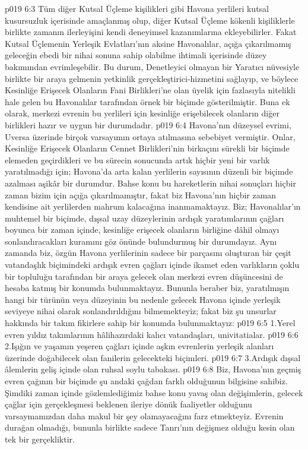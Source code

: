\vs p019 6:3 Tüm diğer Kutsal Üçleme kişilikleri gibi Havona yerlileri kutsal kusursuzluk içerisinde amaçlanmış olup, diğer Kutsal Üçleme kökenli kişiliklerle birlikte zamanın ilerleyişini kendi deneyimsel kazanımlarına ekleyebilirler. Fakat Kutsal Üçlemenin Yerleşik Evlatları’nın aksine Havonalılar, açığa çıkarılmamış geleceğin ebedi bir nihai sonuna sahip olabilme ihtimali içerisinde düzey bakımından evrimleşebilir. Bu durum, Denetleyici olmayan bir Yaratıcı nüvesiyle birlikte bir araya gelmenin yetkinlik gerçekleştirici\hyp{}hizmetini sağlayıp, ve böylece Kesinliğe Erişecek Olanların Fani Birlikleri’ne olan üyelik için fazlasıyla nitelikli hale gelen bu Havonalılar tarafından örnek bir biçimde gösterilmiştir. Buna ek olarak, merkezi evrenin bu yerlileri için kesinliğe erişebilecek olanların diğer birlikleri hazır ve uygun bir durumdadır.
\vs p019 6:4 Havona’nın düzeysel evrimi, Uversa üzerinde birçok varsayımın ortaya atılmasına sebebiyet vermiştir. Onlar, Kesinliğe Erişecek Olanların Cennet Birlikleri’nin birkaçını sürekli bir biçimde elemeden geçirdikleri ve bu sürecin sonucunda artık hiçbir yeni bir varlık yaratılmadığı için; Havona’da arta kalan yerlilerin sayısının düzenli bir biçimde azalması aşikâr bir durumdur. Bahse konu bu hareketlerin nihai sonuçları hiçbir zaman bizim için açığa çıkarılmamıştır, fakat biz Havona’nın hiçbir zaman kendisine ait yerlilerden mahrum kalacağına inanmamaktayız. Biz; Havonalılar'ın muhtemel bir biçimde, dışsal uzay düzeylerinin ardışık yaratımlarının çağları boyunca bir zaman içinde, kesinliğe erişecek olanların birliğine dâhil olmayı sonlandıracakları kuramını göz önünde bulundurmuş bir durumdayız. Aynı zamanda biz, özgün Havona yerlilerinin sadece bir parçasını oluşturan bir çeşit vatandaşlık biçimindeki ardışık evren çağları içinde ikamet eden varlıkların çoklu bir topluluğu tarafından bir araya gelecek olan merkezi evren düşüncesini de hesaba katmış bir konumda bulunmaktayız. Bununla beraber biz, yaratılmışın hangi bir türünün veya düzeyinin bu nedenle gelecek Havona içinde yerleşik seviyeye nihai olarak sonlandırıldığını bilmemekteyiz; fakat biz şu unsurlar hakkında bir takım fikirlere sahip bir konumda bulunmaktayız:
\vs p019 6:5 1.\bibnobreakspace Yerel evren yıldız takımlarının hâlihazırdaki kalıcı vatandaşları, univitatialar.
\vs p019 6:6 2.\bibnobreakspace Işığın ve yaşamın yeşeren çağları içinde aşkın evrenlerin yerleşik alanları üzerinde doğabilecek olan fanilerin gelecekteki biçimleri.
\vs p019 6:7 3.\bibnobreakspace Ardışık dışsal âlemlerin geliş içinde olan ruhsal soylu tabakası.
\vs p019 6:8 Biz, Havona’nın geçmiş evren çağının bir biçimde şu andaki çağdan farklı olduğunun bilgisine sahibiz. Şimdiki zaman içinde gözlemlediğimiz bahse konu yavaş olan değişimlerin, gelecek çağlar için gerçekleşmesi beklenen ileriye dönük faaliyetler olduğunu varsaymamızdan daha makul bir şey olamayacağını farz etmekteyiz. Evrenin durağan olmadığı, bununla birlikte sadece Tanrı’nın değişmez olduğu kesin olan tek bir gerçekliktir.

